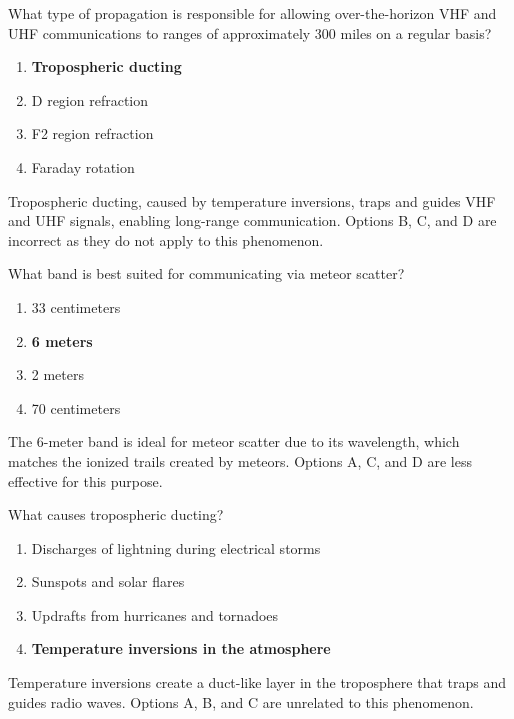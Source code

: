 
\begin{tcolorbox}[colback=gray!10!white,colframe=black!75!black,title={T3C06}]
    What type of propagation is responsible for allowing over-the-horizon VHF and UHF communications to ranges of approximately 300 miles on a regular basis?
    \begin{enumerate}[label=\Alph*),noitemsep]
        \item \textbf{Tropospheric ducting}
        \item D region refraction
        \item F2 region refraction
        \item Faraday rotation
    \end{enumerate}
\end{tcolorbox}
Tropospheric ducting, caused by temperature inversions, traps and guides VHF and UHF signals, enabling long-range communication. Options B, C, and D are incorrect as they do not apply to this phenomenon.


\begin{tcolorbox}[colback=gray!10!white,colframe=black!75!black,title={T3C07}]
    What band is best suited for communicating via meteor scatter?
    \begin{enumerate}[label=\Alph*),noitemsep]
        \item 33 centimeters
        \item \textbf{6 meters}
        \item 2 meters
        \item 70 centimeters
    \end{enumerate}
\end{tcolorbox}
The 6-meter band is ideal for meteor scatter due to its wavelength, which matches the ionized trails created by meteors. Options A, C, and D are less effective for this purpose.


\begin{tcolorbox}[colback=gray!10!white,colframe=black!75!black,title={T3C08}]
    What causes tropospheric ducting?
    \begin{enumerate}[label=\Alph*),noitemsep]
        \item Discharges of lightning during electrical storms
        \item Sunspots and solar flares
        \item Updrafts from hurricanes and tornadoes
        \item \textbf{Temperature inversions in the atmosphere}
    \end{enumerate}
\end{tcolorbox}
Temperature inversions create a duct-like layer in the troposphere that traps and guides radio waves. Options A, B, and C are unrelated to this phenomenon.


